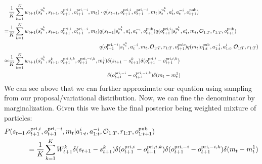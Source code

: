 \begin{equation}
\label{eqn:chap5-sample-index}
\begin{aligned}
    &\frac{1}{K}\sum^K_{k=1} w_{t+1}(s_t^{u^k_t}, s_{t+1}, o^{\operatorname{pri}, i}_{t+1}, o^{\operatorname{pri}, -i}_{t+1}, m_t) \cdot q(s_{t+1}, o^{\operatorname{pri}, i}_{t+1}, o^{\operatorname{pri}, -i}_{t+1}, m_t | s_t^{u^k_t}, a^i_t, a^{-i}_t, o^{\operatorname{pub}}_{t+1}) \\
    =&\begin{aligned}[t]
        \frac{1}{K}\sum^K_{k=1} w_{t+1}(s_t^{u^k_t}, s_{t+1}, o^{\operatorname{pri}, i}_{t+1}, o^{\operatorname{pri}, -i}_{t+1}, m_t) &q(s_{t+1} | s_t^{u^k_t}, a^i_t, a^{-i}_t, o^{\operatorname{pub}}_{t+1}) q(o^{\operatorname{pri}, i}_{t+1} | s_t^{u^k_t}, a^i_t, m_t, \mathcal{O}_{1:T}, r_{1:T}, o^{\operatorname{pub}}_{t+1}) \\
        &q(o^{\operatorname{pri}, -i}_{t+1} | s_t^{u^k_t}, a^{-i}_t, m_t, \mathcal{O}_{1:T}, r_{1:T}, o^{\operatorname{pub}}_{t+1})  q(m_t | o^{\operatorname{pub}}_{1:t}, a^{-i}_{1:t}, a^i_{1:t}, \mathcal{O}_{1:T}, r_{1:T})
    \end{aligned} \\
    \approx&\begin{aligned}[t]
        \frac{1}{K}\sum^K_{k=1} w_{t+1}(s_t^{u^k_t}, s_{t+1}^k, o^{\operatorname{pri}, i, k}_{t+1}, o^{\operatorname{pri}, -i, k}_{t+1}, m_t^1) &\delta (s_{t+1} - s_{t+1}^k) \delta (o^{\operatorname{pri}, i}_{t+1} - o^{\operatorname{pri}, i, k}_{t+1}) \\
        &\delta (o^{\operatorname{pri}, -i}_{t+1} - o^{\operatorname{pri}, -i, k}_{t+1}) \delta (m_t - m_t^1)
    \end{aligned} \\
\end{aligned}
\end{equation}
We can see above that we can further approximate our equation using sampling from our proposal/variational distribution. Now, we can fine the denominator by marginalization. Given this we have the final posterior being weighted mixture of particles:
\begin{equation}
\begin{aligned}
    P(s_{t+1},& o^{\operatorname{pri}, i}_{t+1}, o^{\operatorname{pri}, -i}_{t+1}, m_t | a^{i}_{1:t}, a^{-i}_{1:t}, \mathcal{O}_{1:T}, r_{1:T}, o^{\operatorname{pub}}_{1:t+1}) \\
    &=\frac{1}{K}\sum^K_{k=1} W^k_{t+1} \delta (s_{t+1} - s_{t+1}^k) \delta (o^{\operatorname{pri}, i}_{t+1} - o^{\operatorname{pri}, i, k}_{t+1}) \delta (o^{\operatorname{pri}, -i}_{t+1} - o^{\operatorname{pri}, -i, k}_{t+1}) \delta (m_t - m_t^1)
\end{aligned}
\end{equation}
